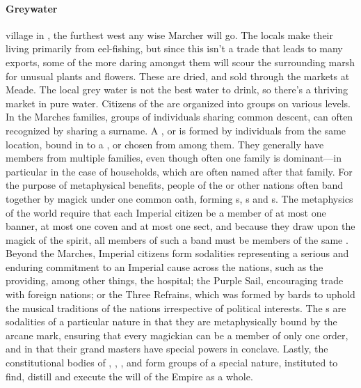 \paragraph{Greywater} village in , the furthest west any wise Marcher will go. The locals make their living primarily from eel-fishing, but since this isn’t a trade that leads to many exports, some of the more daring amongst them will scour the surrounding marsh for unusual plants and flowers. These are dried, and sold through the markets at Meade. The local grey water is not the best water to drink, so there's a thriving market in pure water.
 Citizens of the  are organized into groups on various levels. \localpar {} In the Marches families, groups of individuals sharing common descent, can often recognized by sharing a surname. A ,  or  is formed by individuals from the same location, bound in  to a ,  or  chosen from among them. They generally have members from multiple families, even though often one family is dominant—in particular in the case of households, which are often named after that family. \localpar {} For the purpose of metaphysical benefits, people of the  or other nations often band together by magick under one common oath, forming s, s and s. The metaphysics of the world require that each Imperial citizen be a member of at most one banner, at most one coven and at most one sect, and because they draw upon the magick of the  spirit, all members of such a band must be members of the same . \localpar {} Beyond the Marches, Imperial citizens form sodalities representing a serious and enduring commitment to an Imperial cause across the nations, such as the  providing, among other things, the  hospital; the Purple Sail, encouraging trade with foreign nations; or the Three Refrains, which was formed by bards to uphold the musical traditions of the nations irrespective of political interests. The s are sodalities of a particular nature in that they are metaphysically bound by the  arcane mark, ensuring that every magickian can be a member of only one order, and in that their grand masters have special powers in conclave. \localpar {} Lastly, the constitutional bodies of , , ,  and  form groups of a special nature, instituted to find, distill and execute the will of the Empire as a whole.
\bigparagraphendtwiddle
